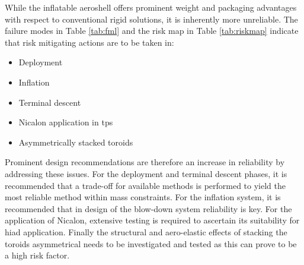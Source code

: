 While the inflatable aeroshell offers prominent weight and packaging advantages with respect to conventional rigid solutions, it is inherently more unreliable. The failure modes in Table \ref{tab:fml} and the risk map in Table \ref{tab:riskmap} indicate that risk mitigating actions are to be taken in:
\begin{itemize}
\item Deployment
\item Inflation
\item Terminal descent
\item Nicalon application in \gls{tps}
\item Asymmetrically stacked toroids
\end{itemize}
Prominent design recommendations are therefore an increase in reliability by addressing these issues. For the deployment and terminal descent phases, it is recommended that a trade-off for available methods is performed to yield the most reliable method within mass constraints. For the inflation system, it is recommended that in design of the blow-down system reliability is key. For the application of Nicalon, extensive testing is required to ascertain its suitability for \gls{hiad} application. Finally the structural and aero-elastic effects of stacking the toroids asymmetrical needs to be investigated and tested as this can prove to be a high risk factor.